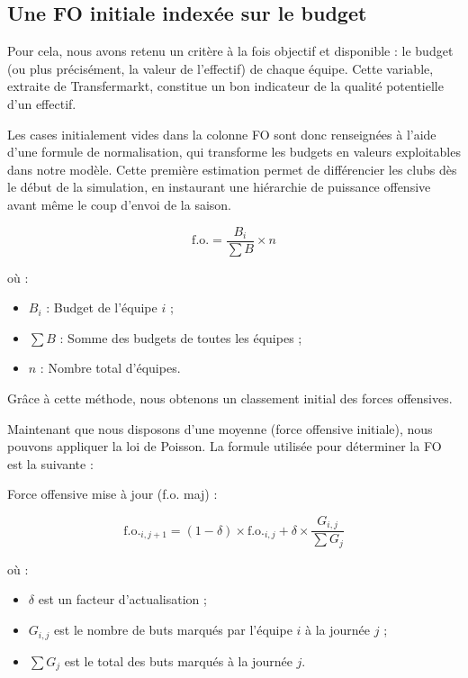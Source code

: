 \documentclass[12pt]{report}
\begin{document}
\subsection{Une FO initiale indexée sur le budget}

Pour cela, nous avons retenu un critère à la fois objectif et disponible : le budget (ou plus précisément, la valeur de l’effectif) de chaque équipe. Cette variable, extraite de Transfermarkt, constitue un bon indicateur de la qualité potentielle d’un effectif.

Les cases initialement vides dans la colonne FO sont donc renseignées à l’aide d’une formule de normalisation, qui transforme les budgets en valeurs exploitables dans notre modèle. Cette première estimation permet de différencier les clubs dès le début de la simulation, en instaurant une hiérarchie de puissance offensive avant même le coup d’envoi de la saison.
\begin{tcolorbox}[colback=gray!5!white, colframe=blue!50!black, title=\textbf{Force offensive initiale}]
\[
\text{f.o.} = \frac{B_i}{\sum B} \times n
\]

où :
\begin{itemize}
  \item $B_i$ : Budget de l’équipe $i$ ;
  \item $\sum B$ : Somme des budgets de toutes les équipes ;
  \item $n$ : Nombre total d’équipes.
\end{itemize}
\end{tcolorbox}

Grâce à cette méthode, nous obtenons un classement initial des forces offensives.

Maintenant que nous disposons d'une moyenne (force offensive initiale), nous pouvons appliquer la loi de Poisson. La formule utilisée pour déterminer la FO est la suivante :

\begin{tcolorbox}[colback=gray!5!white, colframe=blue!50!black, title=\textbf{Mise à jour des forces (après chaque journée)}]
Force offensive mise à jour (f.o. maj) :

\[
\text{f.o.}_{i,j+1} = (1 - \delta) \times \text{f.o.}_{i,j} + \delta \times \frac{G_{i,j}}{\sum G_j}
\]

où :
\begin{itemize}
  \item $\delta$ est un facteur d’actualisation ;
  \item $G_{i,j}$ est le nombre de buts marqués par l’équipe $i$ à la journée $j$ ;
  \item $\sum G_j$ est le total des buts marqués à la journée $j$.
\end{itemize}
\end{tcolorbox}
\end{document}
